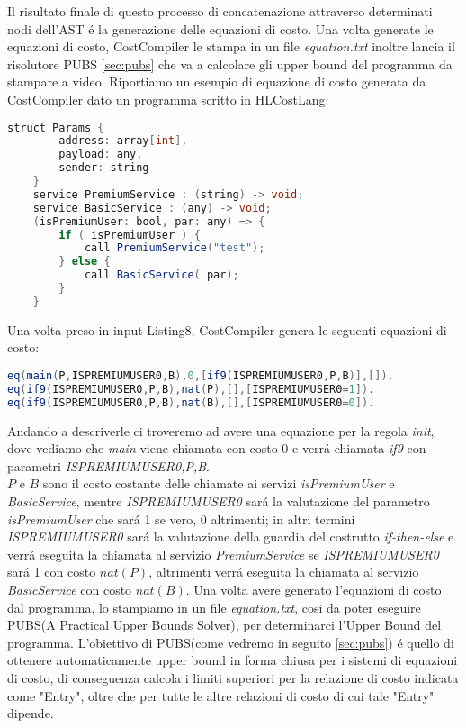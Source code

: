 \documentclass[../../main.tex]{subfiles}
\begin{document}
Il risultato finale di questo processo di concatenazione attraverso determinati nodi dell'AST é la generazione delle equazioni di costo. 
Una volta generate le equazioni di costo, CostCompiler le stampa in un file \textit{equation.txt} inoltre lancia il risolutore PUBS \ref{sec:pubs} che va a calcolare gli upper bound del programma da stampare a video.
Riportiamo un esempio di equazione di costo generata da CostCompiler dato un programma scritto in HLCostLang:
    \begin{lstlisting}[language=Java, caption={Listing8}]
    struct Params {
        address: array[int],
        payload: any,
        sender: string
    }
    service PremiumService : (string) -> void;
    service BasicService : (any) -> void;
    (isPremiumUser: bool, par: any) => {
        if ( isPremiumUser ) {
            call PremiumService("test");
        } else {
            call BasicService( par);
        }
    }
\end{lstlisting}
Una volta preso in input Listing8, CostCompiler genera le seguenti equazioni di costo:
\begin{lstlisting}[language=Java, caption={Equazioni di costo per Listing8}]
eq(main(P,ISPREMIUMUSER0,B),0,[if9(ISPREMIUMUSER0,P,B)],[]).
eq(if9(ISPREMIUMUSER0,P,B),nat(P),[],[ISPREMIUMUSER0=1]).
eq(if9(ISPREMIUMUSER0,P,B),nat(B),[],[ISPREMIUMUSER0=0]).
\end{lstlisting}
Andando a descriverle ci troveremo ad avere una equazione per la regola \textit{init}, dove vediamo che \textit{main} viene chiamata con costo 0 e verrá chiamata \textit{if9} con parametri \textit{ISPREMIUMUSER0,P,B}.\\
$P$ e $B$ sono il costo costante delle chiamate ai servizi \textit{isPremiumUser} e \textit{BasicService}, mentre \textit{ISPREMIUMUSER0} sará la valutazione del parametro \textit{isPremiumUser} che sará 1 se vero, 0 altrimenti; in altri termini \textit{ISPREMIUMUSER0} sará la valutazione della guardia del costrutto \textit{if-then-else} e verrá eseguita la chiamata al servizio \textit{PremiumService} se \textit{ISPREMIUMUSER0} sará 1 con costo $nat(P)$, altrimenti verrá eseguita la chiamata al servizio \textit{BasicService} con costo $nat(B)$. 
Una volta avere generato l'equazioni di costo dal programma, lo stampiamo in un file \textit{equation.txt}, cosi da poter eseguire PUBS(A Practical Upper Bounds Solver), per determinarci l'Upper Bound del programma.
L'obiettivo di PUBS(come vedremo in seguito \ref{sec:pubs}) é quello di ottenere automaticamente upper bound in forma chiusa per i sistemi di equazioni di costo, di conseguenza calcola i limiti superiori per la relazione di costo indicata come "Entry", oltre che per tutte le altre relazioni di costo di cui tale "Entry" dipende.
\end{document}
